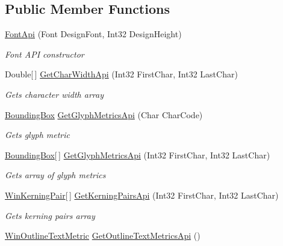 \subsection*{Public Member Functions}
\begin{DoxyCompactItemize}
\item 
\hyperlink{class_pdf_file_writer_1_1_font_api_ac4003605362aaa4795f4bb18d40f1e5c}{Font\+Api} (Font Design\+Font, Int32 Design\+Height)
\begin{DoxyCompactList}\small\item\em Font A\+PI constructor \end{DoxyCompactList}\item 
Double\mbox{[}$\,$\mbox{]} \hyperlink{class_pdf_file_writer_1_1_font_api_a035f264ee283e5b83419fd361f427522}{Get\+Char\+Width\+Api} (Int32 First\+Char, Int32 Last\+Char)
\begin{DoxyCompactList}\small\item\em Gets character width array \end{DoxyCompactList}\item 
\hyperlink{class_pdf_file_writer_1_1_bounding_box}{Bounding\+Box} \hyperlink{class_pdf_file_writer_1_1_font_api_aaf7c63b85e7816dc178365b90e27402e}{Get\+Glyph\+Metrics\+Api} (Char Char\+Code)
\begin{DoxyCompactList}\small\item\em Gets glyph metric \end{DoxyCompactList}\item 
\hyperlink{class_pdf_file_writer_1_1_bounding_box}{Bounding\+Box}\mbox{[}$\,$\mbox{]} \hyperlink{class_pdf_file_writer_1_1_font_api_adc477fa13a0927879b31c09fb791bf53}{Get\+Glyph\+Metrics\+Api} (Int32 First\+Char, Int32 Last\+Char)
\begin{DoxyCompactList}\small\item\em Gets array of glyph metrics \end{DoxyCompactList}\item 
\hyperlink{class_pdf_file_writer_1_1_win_kerning_pair}{Win\+Kerning\+Pair}\mbox{[}$\,$\mbox{]} \hyperlink{class_pdf_file_writer_1_1_font_api_a46e533b5ae48bc40ad5f4dcf349449cc}{Get\+Kerning\+Pairs\+Api} (Int32 First\+Char, Int32 Last\+Char)
\begin{DoxyCompactList}\small\item\em Gets kerning pairs array \end{DoxyCompactList}\item 
\hyperlink{class_pdf_file_writer_1_1_win_outline_text_metric}{Win\+Outline\+Text\+Metric} \hyperlink{class_pdf_file_writer_1_1_font_api_a322d280f5c8b6cfcd9241d7535ded4b7}{Get\+Outline\+Text\+Metrics\+Api} ()

\end{DoxyCompactItemize}
